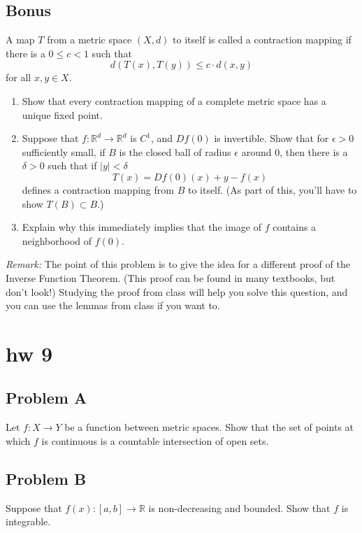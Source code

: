 \documentclass[lang=en,11pt]{template}
\begin{document}
\section*{Bonus}
A map \( T \) from a metric space \( (X, d) \) to itself is called a contraction mapping if there is a \( 0 \leq c < 1 \) such that
\[
d(T(x), T(y)) \leq c \cdot d(x, y)
\]
for all \( x, y \in X \).

\begin{enumerate}
    \item Show that every contraction mapping of a complete metric space has a unique fixed point.
    \item Suppose that \( f : \mathbb{R}^d \to \mathbb{R}^d \) is \( C^1 \), and \( Df(0) \) is invertible. Show that for \( \epsilon > 0 \) sufficiently small, if \( B \) is the closed ball of radius \( \epsilon \) around 0, then there is a \( \delta > 0 \) such that if \( |y| < \delta \)
    \[
    T(x) = Df(0)(x) + y - f(x)
    \]
    defines a contraction mapping from \( B \) to itself. (As part of this, you’ll have to show \( T(B) \subset B \).)
    \item Explain why this immediately implies that the image of \( f \) contains a neighborhood of \( f(0) \).
\end{enumerate}

\textit{Remark:} The point of this problem is to give the idea for a different proof of the Inverse Function Theorem. (This proof can be found in many textbooks, but don’t look!) Studying the proof from class will help you solve this question, and you can use the lemmas from class if you want to.






\chapter{hw 9}

\section*{Problem A}
Let $f : X \to Y$ be a function between metric spaces. Show that the set of points at which $f$ is continuous is a countable intersection of open sets.

\section*{Problem B}
Suppose that $f(x) : [a, b] \to \mathbb{R}$ is non-decreasing and bounded. Show that $f$ is integrable.
\end{document}
